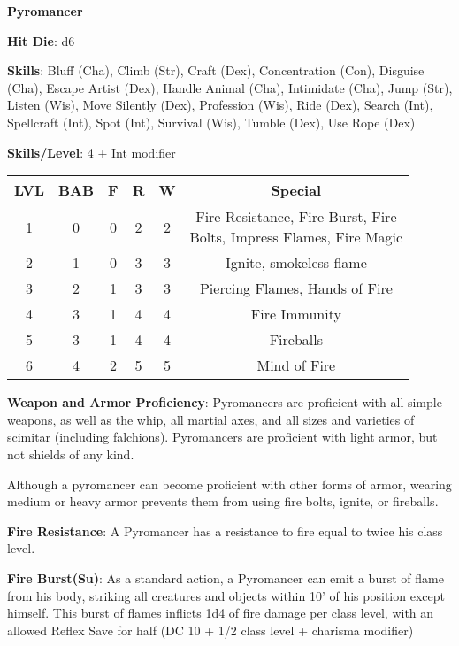 \textbf{\huge{Pyromancer}}

\textbf{Hit Die}: d6

\textbf{Skills}: Bluff (Cha), Climb (Str), Craft (Dex), Concentration (Con), Disguise (Cha), Escape Artist (Dex), Handle Animal (Cha), Intimidate (Cha), Jump (Str), Listen (Wis), Move Silently (Dex), Profession (Wis), Ride (Dex), Search (Int), Spellcraft (Int), Spot (Int), Survival (Wis), Tumble (Dex), Use Rope (Dex)

\textbf{Skills/Level}: 4 + Int modifier

\begin{center}
\begin{adjustwidth}{-4cm}{}
\begin{small}
\begin{tabular}{| c | c | c | c | c | c |}
\hline
LVL &BAB &F &R &W &Special \\
\hline
1 &0 &0 &2 &2 &\makecell{Fire Resistance, Fire Burst, Fire\\ Bolts, Impress Flames, Fire Magic} \\
2 &1 &0 &3 &3 &Ignite, smokeless flame \\
3 &2 &1 &3 &3 &Piercing Flames, Hands of Fire \\
4 &3 &1 &4 &4 &Fire Immunity \\
5 &3 &1 &4 &4 &Fireballs \\
6 &4 &2 &5 &5 &Mind of Fire \\
\hline
\end{tabular}
\end{small}
\end{adjustwidth}
\end{center}

\textbf{Weapon and Armor Proficiency}: Pyromancers are proficient with all simple weapons, as well as the whip, all martial axes, and all sizes and varieties of scimitar (including falchions). Pyromancers are proficient with light armor, but not shields of any kind.

Although a pyromancer can become proficient with other forms of armor, wearing medium or heavy armor prevents them from using fire bolts, ignite, or fireballs.

\textbf{Fire Resistance}: A Pyromancer has a resistance to fire equal to twice his class level.

\textbf{Fire Burst(Su)}: As a standard action, a Pyromancer can emit a burst of flame from his body, striking all creatures and objects within 10’ of his position except himself. This burst of flames inflicts 1d4 of fire damage per class level, with an allowed Reflex Save for half (DC 10 + 1/2 class level + charisma modifier)

